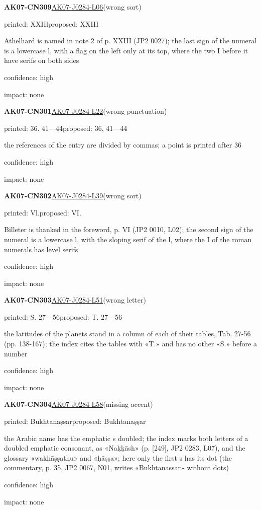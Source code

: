 \documentclass[11pt]{article}
\begin{document}
\noindent\textbf{AK07-CN309}\enspace\hyperlink{AK07-J0284-L06}{AK07-J0284-L06}\enspace(wrong sort)\par\noindent printed: XXIIl\enspace proposed: XXIII\par\noindent Athelhard is named in note 2 of p. XXIII (JP2 0027); the last sign of the numeral is a lowercase l, with a flag on the left only at its top, where the two I before it have serifs on both sides\par\noindent confidence: high\par\noindent impact: none\par\medskip
\noindent\textbf{AK07-CN301}\enspace\hyperlink{AK07-J0284-L22}{AK07-J0284-L22}\enspace(wrong punctuation)\par\noindent printed: 36. 41—44\enspace proposed: 36, 41—44\par\noindent the references of the entry are divided by commas; a point is printed after 36\par\noindent confidence: high\par\noindent impact: none\par\medskip
\noindent\textbf{AK07-CN302}\enspace\hyperlink{AK07-J0284-L39}{AK07-J0284-L39}\enspace(wrong sort)\par\noindent printed: Vl.\enspace proposed: VI.\par\noindent Billeter is thanked in the foreword, p. VI (JP2 0010, L02); the second sign of the numeral is a lowercase l, with the sloping serif of the l, where the I of the roman numerals has level serifs\par\noindent confidence: high\par\noindent impact: none\par\medskip
\noindent\textbf{AK07-CN303}\enspace\hyperlink{AK07-J0284-L51}{AK07-J0284-L51}\enspace(wrong letter)\par\noindent printed: S. 27—56\enspace proposed: T. 27—56\par\noindent the latitudes of the planets stand in a column of each of their tables, Tab. 27-56 (pp. 138-167); the index cites the tables with «T.» and has no other «S.» before a number\par\noindent confidence: high\par\noindent impact: none\par\medskip
\noindent\textbf{AK07-CN304}\enspace\hyperlink{AK07-J0284-L58}{AK07-J0284-L58}\enspace(missing accent)\par\noindent printed: Bukhtanaṣsar\enspace proposed: Bukhtanaṣṣar\par\noindent the Arabic name has the emphatic s doubled; the index marks both letters of a doubled emphatic consonant, as «Naḳḳāsh» (p. [249], JP2 0283, L07), and the glossary «wakhāṣṣathu» and «ḥāṣṣa»; here only the first s has its dot (the commentary, p. 35, JP2 0067, N01, writes «Bukhtanassar» without dots)\par\noindent confidence: high\par\noindent impact: none\par\medskip
\end{document}
